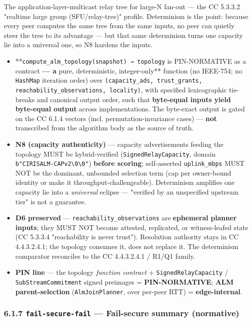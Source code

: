 \documentclass[11pt]{article}
\begin{document}
The application-layer-multicast relay tree for large-N fan-out — the CC 5.3.3.2 "realtime large group (SFU/relay-tree)" profile. Determinism is the point: because every peer computes the same tree from the same inputs, no peer can quietly steer the tree to its advantage — but that same determinism turns one capacity lie into a universal one, so N8 hardens the inputs.


\begin{itemize}\setlength\itemsep{0pt}
\item **\texttt{compute\_alm\_topology(snapshot) → topology} is PIN-NORMATIVE as a contract\textbf{ — a }pure, deterministic, integer-only** function (no IEEE-754; no \texttt{HashMap} iteration order) over \texttt{(capacity\_ads, trust\_grants, reachability\_observations, locality)}, with specified lexicographic tie-breaks and canonical output order, such that \textbf{byte-equal inputs yield byte-equal output} across implementations. The byte-exact output is gated on the CC 6.1.4 vectors (incl. permutation-invariance cases) — \textbf{not} transcribed from the algorithm body as the source of truth.
\item \textbf{N8 (capacity authenticity)} — capacity advertisements feeding the topology MUST be hybrid-verified (\texttt{SignedRelayCapacity}, domain \texttt{b"CIRISALM-CAPv2\textbackslash{}0\textbackslash{}0"}) \textbf{before scoring}; self-asserted \texttt{uplink\_mbps} MUST NOT be the dominant, unbounded selection term (cap per owner-bound identity or make it throughput-challengeable). Determinism amplifies one capacity lie into a \textit{universal} eclipse — "verified by an unspecified upstream tier" is not a guarantee.
\item \textbf{D6 preserved} — \texttt{reachability\_observations} are \textbf{ephemeral planner inputs}; they MUST NOT become attested, replicated, or witness-leafed state (CC 5.3.3.4 "reachability is never trust"). Resolution authority stays in CC 4.4.3.2.4.1; the topology consumes it, does not replace it. The determinism comparator reconciles to the CC 4.4.3.2.4.1 / R1/Q1 family.
\item \textbf{PIN line} — the topology \textit{function contract} + \texttt{SignedRelayCapacity} / \texttt{SubStreamCommitment} signed preimages = \textbf{PIN-NORMATIVE}; \textbf{ALM parent-selection} (\texttt{AlmJoinPlanner}, over per-peer RTT) = \textbf{edge-internal}.
\end{itemize}


\subsubsection*{6.1.7 \texttt{fail-secure-fail} — Fail-secure summary (normative)}
\end{document}
